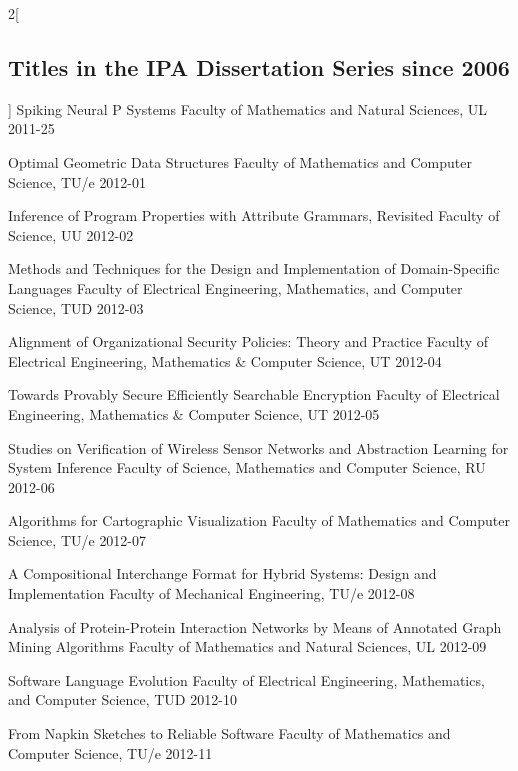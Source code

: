 \begin{multicols}{2}[\subsection*{Titles in the IPA Dissertation Series since 2006}]
         {Spiking Neural P Systems}
         {Faculty of Mathematics and Natural Sciences, UL}
         {2011-25}

         {Optimal Geometric Data Structures}
         {Faculty of Mathematics and Computer Science, TU/e}
         {2012-01}

         {Inference of Program Properties with Attribute Grammars, Revisited}
         {Faculty of Science, UU}
         {2012-02}

         {Methods and Techniques for the Design and Implementation of Domain-Specific Languages}
         {Faculty of Electrical Engineering, Mathematics, and Computer Science, TUD}
         {2012-03}

         {Alignment of Organizational Security Policies: Theory and Practice}
         {Faculty of Electrical Engineering, Mathematics \& Computer Science, UT}
         {2012-04}

         {Towards Provably Secure Efficiently Searchable Encryption}
         {Faculty of Electrical Engineering, Mathematics \& Computer Science, UT}
         {2012-05}

         {Studies on Verification of Wireless Sensor Networks and Abstraction Learning for System Inference}
         {Faculty of Science, Mathematics and Computer Science, RU}
         {2012-06}

         {Algorithms for Cartographic Visualization}
         {Faculty of Mathematics and Computer Science, TU/e}
         {2012-07}

         {A Compositional Interchange Format for Hybrid Systems: Design and Implementation}
         {Faculty of Mechanical Engineering, TU/e}
         {2012-08}

         {Analysis of Protein-Protein Interaction Networks by Means of Annotated Graph Mining Algorithms}
         {Faculty of Mathematics and Natural Sciences, UL}
         {2012-09}

         {Software Language Evolution}
         {Faculty of Electrical Engineering, Mathematics, and Computer Science, TUD}
         {2012-10}

         {From Napkin Sketches to Reliable Software}
         {Faculty of Mathematics and Computer Science, TU/e}
         {2012-11}
\end{multicols}